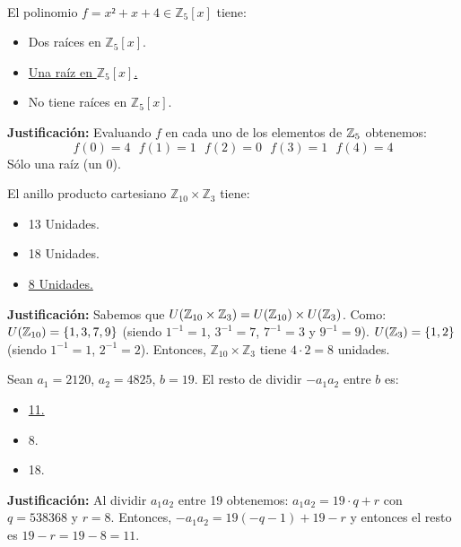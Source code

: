 \documentclass[12pt]{article}
\newcommand{\resetearcontador}{%
  \setcounter{ejercicio}{0} %
}
\begin{document}
    \resetearcontador

    \newpage
    \ 
    \newpage

    
    \begin{ejercicio}
        El polinomio $f = x² + x + 4 \in \mathbb{Z}_5[x]$ tiene:
        \begin{itemize}
            \item Dos raíces en $\mathbb{Z}_5[x]$.
            \item \underline{Una raíz en $\mathbb{Z}_5[x]$.}
            \item No tiene raíces en $\mathbb{Z}_5[x]$.
        \end{itemize}
        \textbf{Justificación:}\newline
        Evaluando $f$ en cada uno de los elementos de $\mathbb{Z}_5$ obtenemos:
        $$f(0) = 4~~~f(1)=1~~~f(2)=0~~~f(3)=1~~~f(4)=4$$
        Sólo una raíz (un 0).
    \end{ejercicio}

    \begin{ejercicio}
        El anillo producto cartesiano $\mathbb{Z}_{10} \times \mathbb{Z}_3$ tiene:
        \begin{itemize}
            \item 13 Unidades.
            \item 18 Unidades.
            \item \underline{8 Unidades.}
        \end{itemize}
        \textbf{Justificación:}\newline
        Sabemos que $U(\mathbb{Z}_{10} \times \mathbb{Z}_3) = U(\mathbb{Z}_{10})\times U(\mathbb{Z}_3)$.\newline
        Como: $U(\mathbb{Z}_{10}) = \{1, 3, 7, 9\}$ (siendo $1^{-1} = 1$, $3^{-1}=7$, $7^{-1}=3$ y $9^{-1}=9$).\newline
        $U(\mathbb{Z}_3) = \{1, 2\}$ (siendo $1^{-1}=1$, $2^{-1}=2$).\newline
        Entonces, $\mathbb{Z}_{10} \times \mathbb{Z}_3$ tiene $4\cdot 2 = 8$ unidades.
    \end{ejercicio}

    \begin{ejercicio}
        Sean $a_1 = 2120$, $a_2 = 4825$, $b = 19$. El resto de dividir $-a_1a_2$ entre $b$ es:
        \begin{itemize}
            \item \underline{11.}
            \item 8.
            \item 18.
        \end{itemize}
        \textbf{Justificación:}\newline
        Al dividir $a_1a_2$ entre 19 obtenemos: $a_1a_2 = 19\cdot q + r$ con $q = 538368$ y $r = 8$.\newline
        Entonces, $-a_1a_2 = 19(-q-1)+19-r$ y entonces el resto es $19 - r = 19 -8 = 11$.
    \end{ejercicio}
\end{document}
